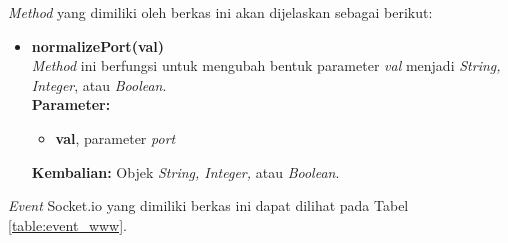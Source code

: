 \begin{enumerate}
\begin{enumerate}
		\textit{Method} yang dimiliki oleh berkas ini akan dijelaskan sebagai berikut:
				
		\begin{itemize}
			\item \textbf{normalizePort(val)} \\
			\textit{Method} ini berfungsi untuk mengubah bentuk parameter \textit{val} menjadi \textit{String, Integer}, atau \textit{Boolean}. \\
			\textbf{Parameter:}
			\begin{itemize}
				\item \textbf{val}, parameter \textit{port}
			\end{itemize}
			\textbf{Kembalian:} Objek \textit{String, Integer,} atau \textit{Boolean}. 
			
			
		\end{itemize}
	
		\textit{Event} Socket.io yang dimiliki berkas ini dapat dilihat pada Tabel \ref{table:event_www}.
		

\end{enumerate}
\end{enumerate}
